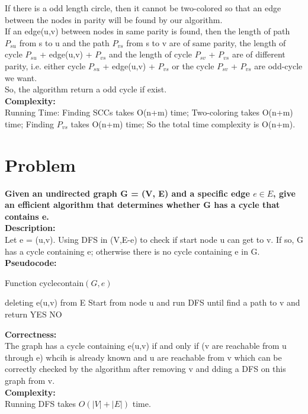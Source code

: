 \documentclass{article}
\begin{document}
If there is a odd length circle, then it cannot be two-colored so that an edge between the nodes in parity will be found by our algorithm.\\
If an edge(u,v) between nodes in same parity is found, then the length of path $P_{su}$ from s to u and the path $P_{vs}$ from s to v are of same parity, the length of cycle $P_{su}$ + edge(u,v) + $P_{vs}$  and the length of cycle $P_{sv}$ + $P_{vs}$ are of different parity, i.e. either cycle $P_{su}$ + edge(u,v) + $P_{vs}$ or the cycle $P_{sv}$ + $P_{vs}$ are odd-cycle we want.\\
 So, the algorithm return a odd cycle if exist.\\
\textbf{\large Complexity:\\}
Running Time:
Finding SCCs takes O(n+m) time; Two-coloring takes O(n+m) time; Finding $P_{vs}$ takes O(n+m) time;
So the total time complexity is O(n+m).\\

\clearpage
\section{Problem \uppercase\expandafter{}} 
\textbf{Given an undirected graph G = (V, E) and a specific edge $e \in E$, give an efficient algorithm that determines whether G has a cycle that contains e.}\\
\textbf{\large Description:\\}
Let e = (u,v). Using DFS in (V,E-e) to check if start node u can get to v. If so, G has a cycle containing e; otherwise there is no cycle containing e in G.\\
\textbf{\large Pseudocode:\\}
\begin{algorithm}[H]
  \caption{Function cyclecontain$(G,e)$}
  \label{alg1}
  \begin{algorithmic}
  \STATE deleting e(u,v) from E
  \STATE Start from node u and run DFS until find a path to v and return YES
  \RETURN NO
  \end{algorithmic}
\end{algorithm}
\noindent\textbf{\large Correctness:\\}
The graph has a cycle containing e(u,v) if and only if (v are reachable from u through e) whcih is already known and u are reachable from v which can be correctly checked by the algorithm after removing v and dding a DFS on this graph from v. \\
\textbf{\large Complexity:\\}
Running DFS takes $O(|V|+|E|)$ time.
\end{document}
